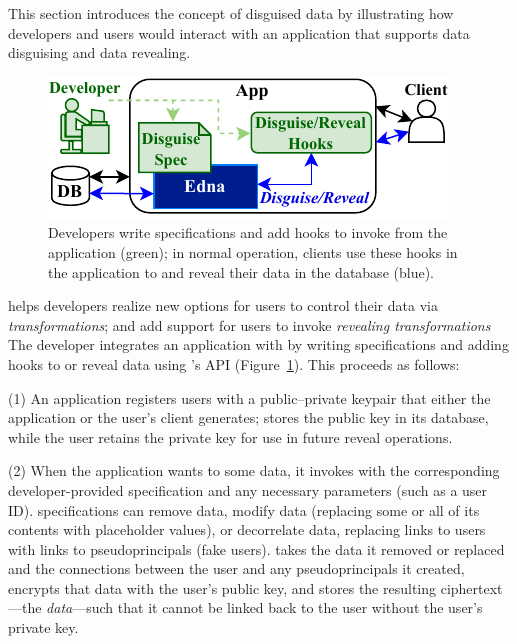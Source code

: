 This section introduces the concept of disguised data by illustrating how
developers and users would interact with an application that supports 
data disguising and data revealing.
%

\begin{figure}[h!]
  \centering
    \includegraphics{figs/edna_overview}
    \caption{Developers write \xx specifications and add hooks to invoke \sys
        from the application (green); in normal operation, clients use these
        hooks in the application to \xx and reveal their data in the database
        (blue).
    }
  \label{f:edna-overview}
\end{figure}
%
\sys helps developers realize new options for users to control their data
via \emph{\xxing transformations}; and add support for users to invoke
\emph{revealing transformations}
%
The developer integrates an application with \sys by writing \xx specifications
and adding hooks to \xx or reveal data using \sys's API
(Figure~\ref{f:edna-overview}).
%
This proceeds as follows:
%

%
(1) An application registers users with a public--private keypair
that either the application or the user's client generates; \sys stores the
public key in its database, while the user retains the private key for use in
future reveal operations.
%

%
(2) When the application wants to \xx some data, it invokes \sys with the
corresponding developer-provided \xx specification and any necessary
parameters (such as a user ID).
%
\Xx specifications can remove data, modify data (replacing some or all of its
contents with placeholder values), or decorrelate data, replacing
links to users with links to pseudoprincipals (fake users).
%
%
\sys takes the data it removed or replaced and the connections between
the user and any pseudoprincipals it created, encrypts that data with the user's
public key, and stores the resulting ciphertext---the \emph{\xxed
data}---such that it cannot be linked back to the user without the user's
private key.
%
%


